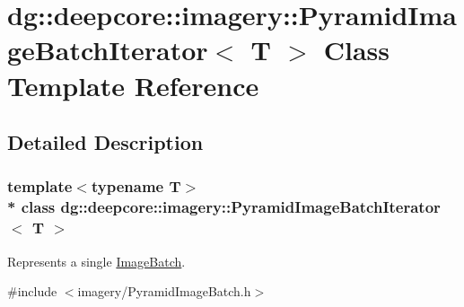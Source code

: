 \hypertarget{classdg_1_1deepcore_1_1imagery_1_1_pyramid_image_batch_iterator}{}\section{dg\+:\+:deepcore\+:\+:imagery\+:\+:Pyramid\+Image\+Batch\+Iterator$<$ T $>$ Class Template Reference}
\label{classdg_1_1deepcore_1_1imagery_1_1_pyramid_image_batch_iterator}


\subsection{Detailed Description}
\subsubsection*{template$<$typename T$>$\\*
class dg\+::deepcore\+::imagery\+::\+Pyramid\+Image\+Batch\+Iterator$<$ T $>$}

Represents a single \hyperlink{structdg_1_1deepcore_1_1imagery_1_1_image_batch}{Image\+Batch}. 

{\ttfamily \#include $<$imagery/\+Pyramid\+Image\+Batch.\+h$>$}

